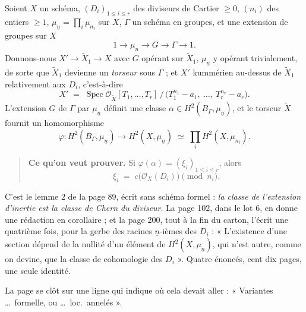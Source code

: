 \documentclass[11pt,a4paper]{article}
\begin{document}
Soient $X$ un schéma, $(D_{i})_{1 \leqslant i \leqslant r}$ des diviseurs de
Cartier $\geqslant 0$, $(n_{i})$ des entiers $\geqslant 1$,
$\mu_{\underline{n}} = \prod_{i} \mu_{n_{i}}$ sur $X$, $\Gamma$ un schéma en
groupes, et une extension de groupes sur $X$
\[
  1 \longrightarrow \mu_{\underline{n}} \longrightarrow G \longrightarrow
  \Gamma \longrightarrow 1 .
\]
Donnons-nous $X' \to \tilde{X}_{1} \to X$ avec $G$ opérant sur $\tilde{X}_{1}$,
$\mu_{\underline{n}}$ y opérant trivialement, de sorte que $\tilde{X}_{1}$
devienne un \emph{torseur} sous $\Gamma$ ; et $X'$ kummérien au-dessus de
$\tilde{X}_{1}$ relativement aux $D_{i}$, c'est-à-dire
\[
  X' \;=\; \operatorname{Spec}
  \mathcal{O}_{\tilde{X}}[T_{1}, \dots, T_{r}]\,\big/\,
  \bigl(T_{1}^{n_{1}} - a_{1},\ \dots,\ T_{r}^{n_{r}} - a_{r}\bigr) .
\]
L'extension $G$ de $\Gamma$ par $\mu_{\underline{n}}$ définit une classe
$\alpha \in H^{2}(B_{\Gamma}, \mu_{\underline{n}})$, et le torseur
$\tilde{X}$ fournit un homomorphisme
\[
  \varphi : H^{2}(B_{\Gamma}, \mu_{\underline{n}}) \longrightarrow
  H^{2}(X, \mu_{\underline{n}}) \;\simeq\;
  \prod_{i} H^{2}(X, \mu_{n_{i}}) .
\]

\begin{quote}
\textbf{Ce qu'on veut prouver.} Si $\varphi(\alpha) = (\xi_{i})_{1 \leqslant i
\leqslant r}$, alors
\[
  \xi_{i} \;=\; c\bigl(\mathcal{O}_{X}(D_{i})\bigr) \pmod{n_{i}} .
\]
\end{quote}

C'est le lemme 2 de la page 89, écrit sans schéma formel : \emph{la classe de
l'extension d'inertie est la classe de Chern du diviseur}. La page 102, dans le
lot 6, en donne une rédaction en corollaire ; et la page 200, tout à la fin du
carton, l'écrit une quatrième fois, pour la gerbe des racines
$\underline{n}$-ièmes des $D_{i}$ : « L'existence d'une section dépend de la
nullité d'un élément de $H^{2}(X, \mu_{\underline{n}})$, qui n'est autre,
comme on devine, que la classe de cohomologie des $D_{i}$ ». Quatre énoncés,
cent dix pages, une seule identité.

La page se clôt sur une ligne qui indique où cela devait aller : « Variantes
\dots\ formelle, ou \dots\ loc.\ annelés ».
\end{document}
